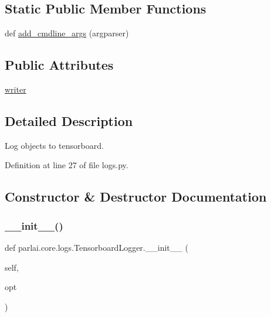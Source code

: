 \subsection*{Static Public Member Functions}
\begin{DoxyCompactItemize}
\item 
def \hyperlink{classparlai_1_1core_1_1logs_1_1TensorboardLogger_a22488a4b41a75dce0a1c467418882e83}{add\+\_\+cmdline\+\_\+args} (argparser)
\end{DoxyCompactItemize}
\subsection*{Public Attributes}
\begin{DoxyCompactItemize}
\item 
\hyperlink{classparlai_1_1core_1_1logs_1_1TensorboardLogger_afc71d93e950d01b95fc824d347907a58}{writer}
\end{DoxyCompactItemize}


\subsection{Detailed Description}
\begin{DoxyVerb}Log objects to tensorboard.\end{DoxyVerb}
 

Definition at line 27 of file logs.\+py.



\subsection{Constructor \& Destructor Documentation}
\mbox{\label{classparlai_1_1core_1_1logs_1_1TensorboardLogger_a771ea3df52af2ad82a038446fb15fdf3}} 
\subsubsection{\texorpdfstring{\+\_\+\+\_\+init\+\_\+\+\_\+()}{\_\_init\_\_()}}
{\footnotesize\ttfamily def parlai.\+core.\+logs.\+Tensorboard\+Logger.\+\_\+\+\_\+init\+\_\+\+\_\+ (\begin{DoxyParamCaption}\item[{}]{self,  }\item[{}]{opt }\end{DoxyParamCaption})}



